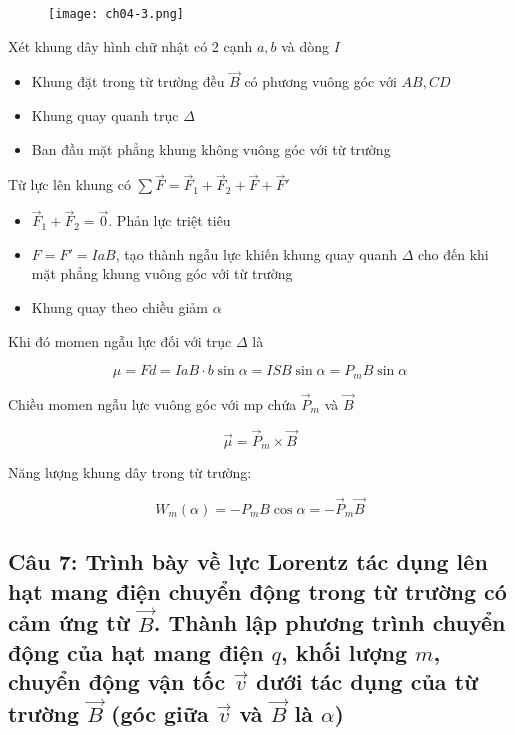 \begin{figure}[h]
  \centering
  \texttt{[image: ch04-3.png]}
\end{figure}

Xét khung dây hình chữ nhật có 2 cạnh $a, b$ và dòng $I$

\begin{itemize}
  \item Khung đặt trong từ trường đều $\vec{B}$ có phương vuông góc với $AB, CD$
  \item Khung quay quanh trục $\Delta$
  \item Ban đầu mặt phẳng khung không vuông góc với từ trường
\end{itemize}

Từ lực lên khung có $\sum \vec{F} = \vec{F}_1 + \vec{F}_2 + \vec{F} + \vec{F}'$

\begin{itemize}
  \item $\vec{F}_1 + \vec{F}_2 = \vec{0}$. Phản lực triệt tiêu 
  \item $F = F' = IaB$, tạo thành ngẫu lực khiến khung quay quanh $\Delta$ cho đến khi mặt phẳng khung vuông góc với từ trường
  \item Khung quay theo chiều giảm $\alpha$
\end{itemize}

Khi đó momen ngẫu lực đối với trục $\Delta$ là 

\begin{equation*}
  \mu = Fd = IaB \cdot b\sin\alpha = ISB\sin\alpha = P_m B \sin\alpha
\end{equation*}

Chiều momen ngẫu lực vuông góc với mp chứa $\vec{P}_m$ và $\vec{B}$

\begin{equation*}
  \vec{\mu} = \vec{P}_m \times \vec{B}
\end{equation*}

Năng lượng khung dây trong từ trường:

\begin{equation*}
  W_m(\alpha) = -P_mB\cos\alpha = -\vec{P}_m\vec{B}
\end{equation*}

\subsection[Câu 7]{Câu 7: Trình bày về lực Lorentz tác dụng lên hạt mang điện chuyển động trong từ trường có cảm ứng từ $\vec{B}$. Thành lập phương trình chuyển động của hạt mang điện $q$, khối lượng $m$, chuyển động vận tốc $\vec{v}$ dưới tác dụng của từ trường $\vec{B}$ (góc giữa $\vec{v}$ và $\vec{B}$ là $\alpha$)}

